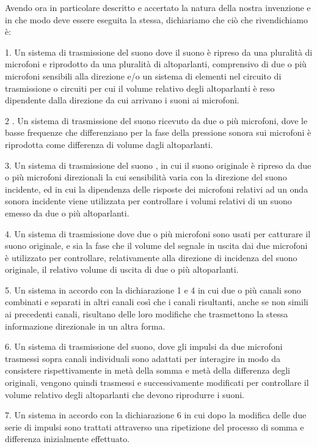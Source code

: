 \documentclass[11pt]{article}
\begin{document}
\begin{multicols*}{2}
Avendo ora in particolare descritto e accertato la natura della nostra invenzione e in che modo deve essere eseguita la stessa, dichiariamo che ciò che rivendichiamo è:

1. Un sistema di trasmissione del suono dove il suono è ripreso da una pluralità di microfoni e riprodotto da una pluralità di altoparlanti, comprensivo di due o più microfoni sensibili alla direzione e/o un sistema di elementi nel circuito di trasmissione o circuiti per cui il volume relativo degli altoparlanti è reso dipendente dalla direzione da cui arrivano i suoni ai microfoni.

2 . Un sistema di trasmissione del suono ricevuto da due o più microfoni, dove le basse frequenze che differenziano per la fase della pressione sonora sui microfoni è riprodotta come differenza di volume dagli altoparlanti.

3. Un sistema di trasmissione del suono , in cui il suono originale è ripreso da due o più microfoni direzionali la cui sensibilità varia con la direzione del suono incidente, ed in cui la dipendenza delle risposte dei microfoni relativi ad un onda sonora incidente viene utilizzata per controllare i volumi relativi di un suono emesso da due o più altoparlanti.

4. Un sistema di trasmissione dove due o più microfoni sono usati per catturare il suono originale, e sia la fase che il volume del segnale in uscita dai due microfoni è utilizzato per controllare, relativamente alla direzione di incidenza del suono originale, il relativo volume di uscita di due o più altoparlanti.

5. Un sistema in accordo con la dichiarazione 1 e 4 in cui due o più canali sono combinati e separati in altri canali così che i canali risultanti, anche se non simili ai precedenti canali, risultano delle loro modifiche che trasmettono la stessa informazione direzionale in un altra forma.

6. Un sistema di trasmissione del suono, dove gli impulsi da due microfoni trasmessi sopra canali individuali sono adattati per interagire in modo da consistere rispettivamente in metà della somma e metà della differenza degli originali, vengono quindi trasmessi e successivamente modificati per controllare il volume relativo degli altoparlanti che devono riprodurre i suoni.

7. Un sistema in accordo con la dichiarazione 6 in cui dopo la modifica delle due serie di impulsi sono trattati attraverso una ripetizione del processo di somma e differenza inizialmente effettuato.


\end{multicols*}
\end{document}
